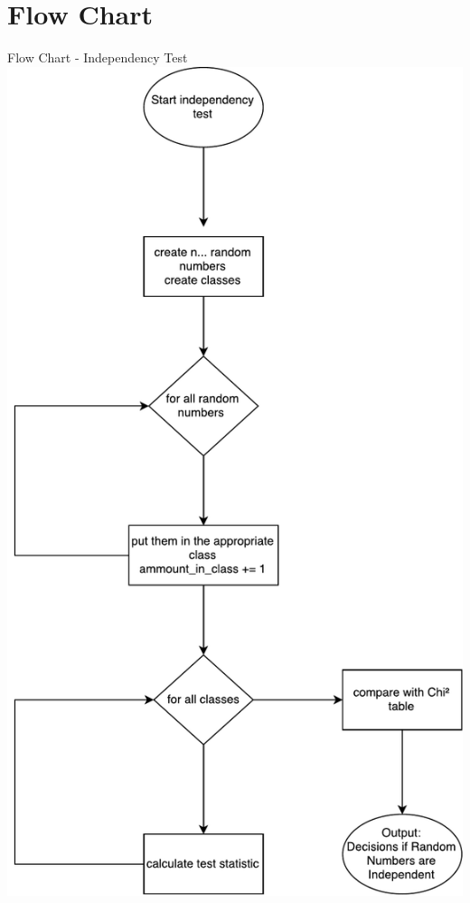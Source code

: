 \section{Flow Chart}
\begin{frame}{Flow Chart - Independency Test}
	\centering
  	\includegraphics[scale=0.22]{BSP25_IndependencyTestFlowChart.pdf}
\end{frame}

